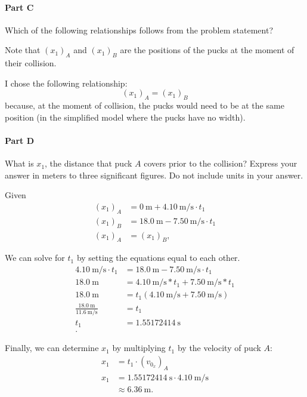\paragraph{Part C}

Which of the following relationships follows from the problem statement?

Note that $\left( x_1 \right)_{A}$  and $\left( x_1 \right)_{B}$ are the positions of the pucks at the moment of their collision.

\vspace{1em}

\begin{solution}
	I chose the following relationship:
	\[
		\left( x_1 \right)_{A} = \left( x_1 \right)_{B}
	\]
	because, at the moment of collision, the pucks would need to be at the same position (in the simplified model where the pucks have no width).
\end{solution}

\paragraph{Part D}

What is $x_1$, the distance that puck $A$ covers prior to the collision?
Express your answer in meters to three significant figures. Do not include units in your answer.

\vspace{1em}

\begin{solution}
	Given
	\begin{align*}
		\left( x_1 \right)_{A} &= 0~\text{m}+4.10~\text{m/s} \cdot t_1 \\
		\left( x_1 \right)_{B} &= 18.0~\text{m} - 7.50~\text{m/s} \cdot t_1 \\
		\left( x_1 \right)_{A} &= \left( x_1 \right)_{B}
		,\end{align*}

	We can solve for $t_1$ by setting the equations equal to each other.
	\begin{align*}
		4.10~\text{m/s} \cdot t_1 &= 18.0~\text{m} - 7.50~\text{m/s} \cdot t_1 \\
		18.0~\text{m} &= 4.10~\text{m/s} * t_1 + 7.50~\text{m/s} * t_1 \\
		18.0~\text{m} &= t_1 \left( 4.10~\text{m/s} + 7.50~\text{m/s} \right) \\
		\frac{18.0~\text{m}}{11.6~\text{m/s}} &= t_1 \\
		t_1 &= 1.55172414~\text{s} \\
		.\end{align*}

	Finally, we can determine $x_1$ by multiplying $t_1$ by the velocity of puck $A$:
	\begin{align*}
		x_1 &= t_1 \cdot \left( v_{0_{x}} \right)_{A} \\
		x_1 &= 1.55172414~\text{s} \cdot 4.10~\text{m/s} \\
		&\approx 6.36~\text{m}
		.\end{align*}
\end{solution}

